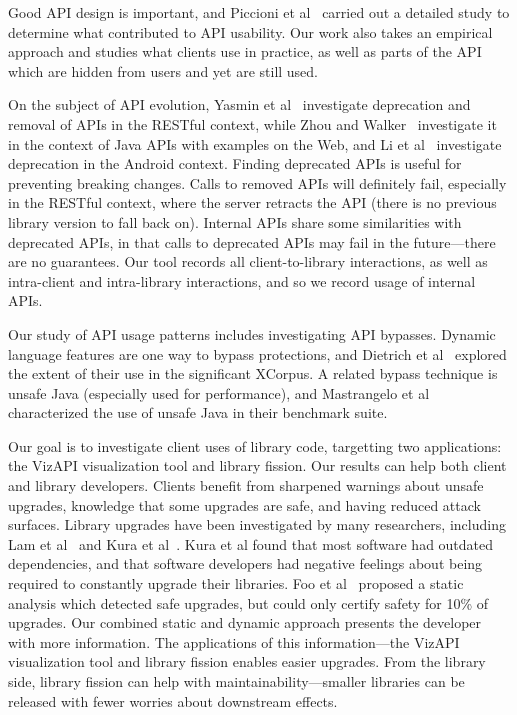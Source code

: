 Good API design is important, and Piccioni et al~\cite{piccioni13:_empir_study_api_usabil} carried out a detailed study to determine what contributed to API usability. Our work also takes an empirical approach and studies what clients use in practice, as well as parts of the API which are hidden from users and yet are still used. 

On the subject of API evolution, Yasmin et al~\cite{yasmin20:_first_look_deprec_restf_apis} investigate deprecation and removal of APIs in the RESTful context, while Zhou and Walker~\cite{zhou16:_api_deprec} investigate it in the context of Java APIs with examples on the Web, and Li et al~\cite{li18:_charac_deprec_android_apis} investigate deprecation in the Android context. Finding deprecated APIs is useful for preventing breaking changes. Calls to removed APIs will definitely fail, especially in the RESTful context, where the server retracts the API (there is no previous library version to fall back on). Internal APIs share some similarities with deprecated APIs, in that calls to deprecated APIs may fail in the future---there are no guarantees. Our tool records all client-to-library interactions, as well as intra-client and intra-library interactions, and so we record usage of internal APIs.

Our study of API usage patterns includes investigating API bypasses. Dynamic language features are one way to bypass protections,
and Dietrich et al~\cite{dietrich2017xcorpus} explored the extent of their use in the significant XCorpus. A related bypass technique
is unsafe Java (especially used for performance), and Mastrangelo et al~\cite{mastrangelo15:_use_your_own_risk} characterized the
use of unsafe Java in their benchmark suite.

Our goal is to investigate client uses of library code, targetting two applications: the VizAPI visualization tool and library fission. Our results can help both client and library developers. Clients benefit from sharpened warnings about unsafe upgrades, knowledge that some upgrades are safe, and having reduced attack surfaces. Library upgrades have been investigated by many researchers, including Lam et al~\cite{lam20:_puttin_seman_seman_version} and Kura et al~\cite{kula18:_do_devel_updat_their_librar_depen}. Kura et al found that most software had outdated dependencies, and that software developers had negative feelings about being required to constantly upgrade their libraries. Foo et al~\cite{foo18:_effic_static_check_librar_updat} proposed a static analysis which detected safe upgrades, but could only certify safety for 10\% of upgrades. Our combined static and dynamic approach presents the developer with more information. The applications of this information---the VizAPI visualization tool and library fission enables easier upgrades. From the library side, library fission can help with maintainability---smaller libraries can be released with fewer worries about downstream effects.

